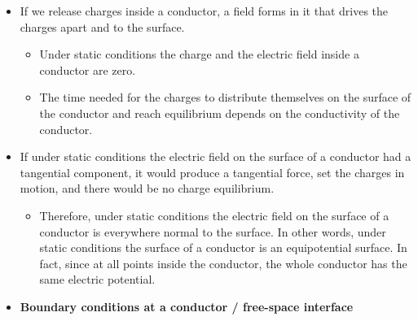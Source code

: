 \begin{ELunit}

\begin{itemize}
\tightlist
\item
  If we release charges inside a conductor, a field forms in it that drives the charges apart and to the surface.

  \begin{itemize}
  \item
    Under static conditions the charge and the electric field inside a conductor are zero.
  \item
    The time needed for the charges to distribute themselves on the surface of the conductor and reach equilibrium depends on the conductivity of the conductor.
  \end{itemize}
\item
  If under static conditions the electric field on the surface of a conductor had a tangential component, it would produce a tangential force, set the charges in motion, and there would be no charge equilibrium.

  \begin{itemize}
  \tightlist
  \item
    Therefore, under static conditions the electric field on the surface of a conductor is everywhere normal to the surface. In other words, under static conditions the surface of a conductor is an equipotential surface. In fact, since  at all points inside the conductor, the whole conductor has the same electric potential.
  \end{itemize}
\item
  \textbf{Boundary conditions at a conductor / free-space interface}
\end{itemize}


\end{ELunit}


